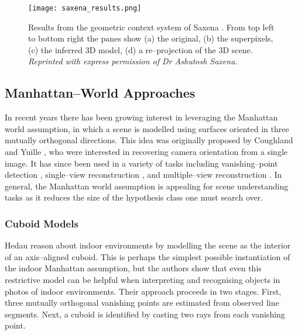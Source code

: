 \begin{figure}[tb]
\centering
\texttt{[image: saxena\_results.png]}
\caption{Results from the geometric context system of Saxena \etal
  \cite{Saxena09}. From top left to bottom right the panes show (a)
  the original, (b) the superpixels, (c) the inferred 3D model, (d) a
  re--projection of the 3D scene.
  \textit{Reprinted with express permission of Dr Ashutosh Saxena.}
  }
\label{fig:saxena-result}
\end{figure}

\subsection{Manhattan--World Approaches}

In recent years there has been growing interest in leveraging the
Manhattan world assumption, in which a scene is modelled using
surfaces oriented in three mutually orthogonal directions. This idea
was originally proposed by Coughland and Yuille \cite{Coughlan99}, who
were interested in recovering camera orientation from a single
image. It has since been used in a variety of tasks including
vanishing--point detection \cite{Zhang02}, single--view reconstruction
\cite{Lee09,Flint10eccv}, and multiple--view reconstruction
\cite{Furukawa09,Flint11}. In general, the Manhattan world assumption
is appealing for scene understanding tasks as it reduces the size of
the hypothesis class one must search over.

\subsubsection{Cuboid Models}

Hedau \etal \cite{Hedau09} reason about indoor environments by
modelling the scene as the interior of an axis--aligned cuboid. This
is perhaps the simplest possible instantiation of the indoor Manhattan
assumption, but the authors show that even this restrictive model can
be helpful when interpreting and recognising objects in photos of
indoor environments. Their approach proceeds in two stages. First,
three mutually orthogonal vanishing points are estimated from
observed line segments. Next, a cuboid is identified by casting two
rays from each vanishing point.


